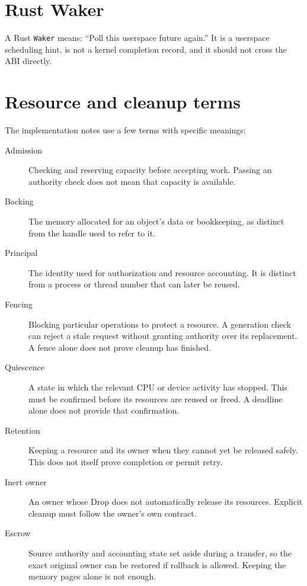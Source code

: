 \section{Rust Waker}

A Rust \texttt{Waker} means: ``Poll this userspace future again.'' It is a
userspace scheduling hint, is not a kernel completion record, and it should not
cross the ABI directly.

\section{Resource and cleanup terms}

The implementation notes use a few terms with specific meanings:

\begin{description}
    \item[Admission] Checking and reserving capacity before accepting work.
        Passing an authority check does not mean that capacity is available.
    \item[Backing] The memory allocated for an object's data or bookkeeping,
        as distinct from the handle used to refer to it.
    \item[Principal] The identity used for authorization and resource accounting.
        It is distinct from a process or thread number that can later be reused.
    \item[Fencing] Blocking particular operations to protect a resource. A
        generation check can reject a stale request without granting authority
        over its replacement. A fence alone does not prove cleanup has finished.
    \item[Quiescence] A state in which the relevant CPU or device activity has
        stopped. This must be confirmed before its resources are reused or freed.
        A deadline alone does not provide that confirmation.
    \item[Retention] Keeping a resource and its owner when they cannot yet be
        released safely. This does not itself prove completion or permit retry.
    \item[Inert owner] An owner whose Drop does not automatically release its
        resources. Explicit cleanup must follow the owner's own contract.
    \item[Escrow] Source authority and accounting state set aside during a
        transfer, so the exact original owner can be restored if rollback is
        allowed. Keeping the memory pages alone is not enough.
\end{description}

